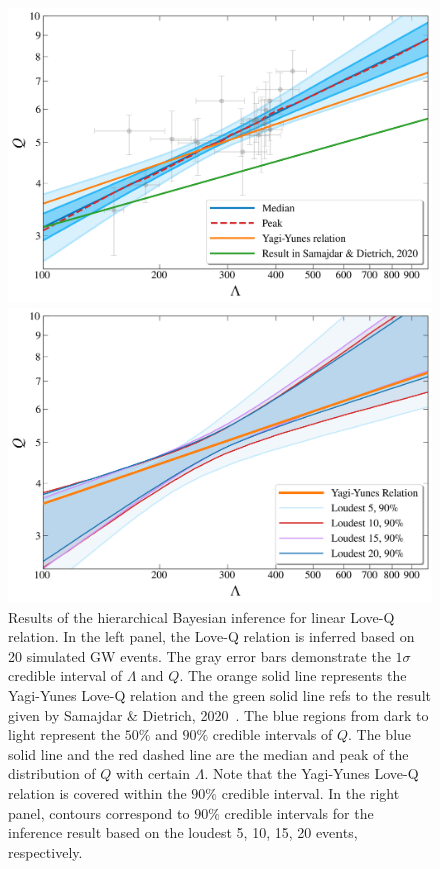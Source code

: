 \documentclass[a4paper,11pt]{article}
\begin{document}
\begin{figure}
\begin{minipage}[t]{0.48\textwidth}
    \includegraphics[width=\textwidth]{hierarchical_results_AP4_2d.png}
\end{minipage}
\hfill
\begin{minipage}[t]{0.48\textwidth}
    \includegraphics[width=\textwidth]{2sigma_region.png}
\end{minipage}
\caption{Results of the hierarchical Bayesian inference for linear Love-Q relation. 
    In the left panel, the Love-Q relation is inferred based on 20 simulated GW events. 
    The gray error bars demonstrate the $1\sigma$ credible interval of $\Lambda$ and $Q$. 
    The orange solid line represents the Yagi-Yunes Love-Q relation and the green solid line refs to the result given by Samajdar \& Dietrich, 2020~\cite{Samajdar:2020xrd}. 
    The blue regions from dark to light represent the $50\%$ and $90\%$ credible intervals of $Q$. The blue solid line and the red dashed line are the median and peak 
    of the distribution of $Q$ with certain $\Lambda$.
    Note that the Yagi-Yunes Love-Q relation is covered within the $90\%$ credible interval. 
    In the right panel, contours correspond to $90\%$ credible intervals for the inference result based on the loudest 5, 10, 15, 20 events, respectively.
    \label{2-d_Love_Q} }
\end{figure}
\end{document}
